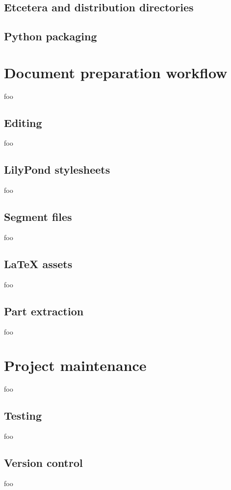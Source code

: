 
\subsection{Etcetera and distribution directories}

\subsection{Python packaging}


\section{Document preparation workflow}

foo

\subsection{Editing}

foo

\subsection{LilyPond stylesheets}

foo

\subsection{Segment files}

foo

\subsection{LaTeX assets}

foo

\subsection{Part extraction}

foo

\section{Project maintenance}

foo

\subsection{Testing}

foo

\subsection{Version control}

foo